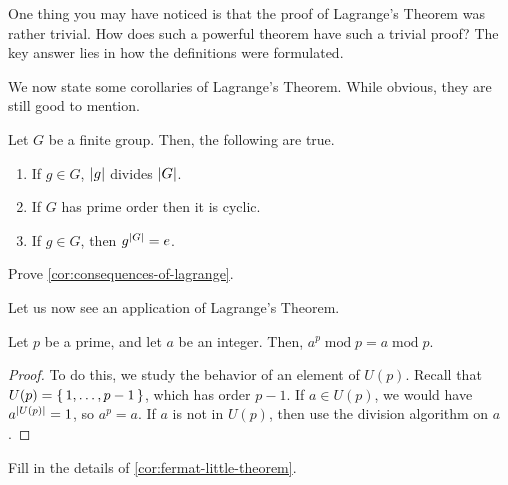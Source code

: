 \documentclass[./main.tex]{subfiles}
\begin{document}
One thing you may have noticed is that the proof of Lagrange's Theorem was
rather trivial. How does such a powerful theorem have such a trivial proof? 
The key answer lies in how the definitions were formulated.

We now state some corollaries of Lagrange's Theorem. While obvious, they are
still good to mention.
\begin{corollary}
\label{cor:consequences-of-lagrange}
    Let $G$ be a finite group. Then, the following are true.
    \begin{enumerate}
        \item If $g \in G$, $\abs{g}$ divides $\abs{G}$.
        \item If $G$ has prime order then it is cyclic.
        \item If $g \in G$, then $g^{\abs G} = e$.
    \end{enumerate}
\end{corollary}
\begin{exercise}
    Prove \cref{cor:consequences-of-lagrange}.
\end{exercise}

Let us now see an application of Lagrange's Theorem.

\begin{corollary}
\label{cor:fermat-little-theorem}
    Let $p$ be a prime, and let $a$ be an integer. Then, $a^p \operatorname{mod}
    p = a \operatorname{mod} p$.  
\end{corollary}
\begin{proof}
    To do this, we study the behavior of an element of $U(p)$. Recall that $U(p)
    = \set{1, \dots, p-1}$, which has order $p-1$. If $a \in U(p)$, we would
    have $a^{\abs{U(p)}} = 1$, so $a^p = a$. If $a$ is not in $U(p)$, then use
    the division algorithm on $a$.
\end{proof}
\begin{exercise}
    Fill in the details of \cref{cor:fermat-little-theorem}.
\end{exercise}
\end{document}
